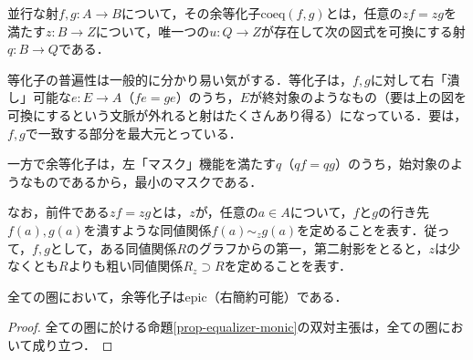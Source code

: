\documentclass[uplatex, 12pt, dvipdfmx]{jsarticle}
\begin{document}
\begin{definition}
    並行な射$f,g:A\to B$について，その余等化子$\mathrm{coeq}(f,g)$とは，任意の$zf=zg$を満たす$z:B\to Z$について，唯一つの$u:Q\to Z$が存在して次の図式を可換にする射$q:B\to Q$である．
    \begin{center}
    \end{center}
\end{definition}
\begin{remark*}[なんかすごい言い換え見つけた]
    等化子の普遍性は一般的に分かり易い気がする．等化子は，$f,g$に対して右「潰し」可能な$e:E\to A$（$fe=ge$）のうち，$E$が終対象のようなもの（要は上の図を可換にするという文脈が外れると射はたくさんあり得る）になっている．要は，$f,g$で一致する部分を最大元とっている．

    一方で余等化子は，左「マスク」機能を満たす$q$（$qf=qg$）のうち，始対象のようなものであるから，最小のマスクである．

    なお，前件である$zf=zg$とは，$z$が，任意の$a\in A$について，$f$と$g$の行き先$f(a),g(a)$を潰すような同値関係$f(a)\sim_zg(a)$を定めることを表す．従って，$f,g$として，ある同値関係$R$のグラフからの第一，第二射影をとると，$z$は少なくとも$R$よりも粗い同値関係$R_z\supset R$を定めることを表す．
\end{remark*}
\begin{proposition}\label{prop-coequalizer-epic}
    全ての圏において，余等化子はepic（右簡約可能）である．
\end{proposition}
\begin{proof}
    全ての圏に於ける命題\ref{prop-equalizer-monic}の双対主張は，全ての圏において成り立つ．
\end{proof}
\end{document}
